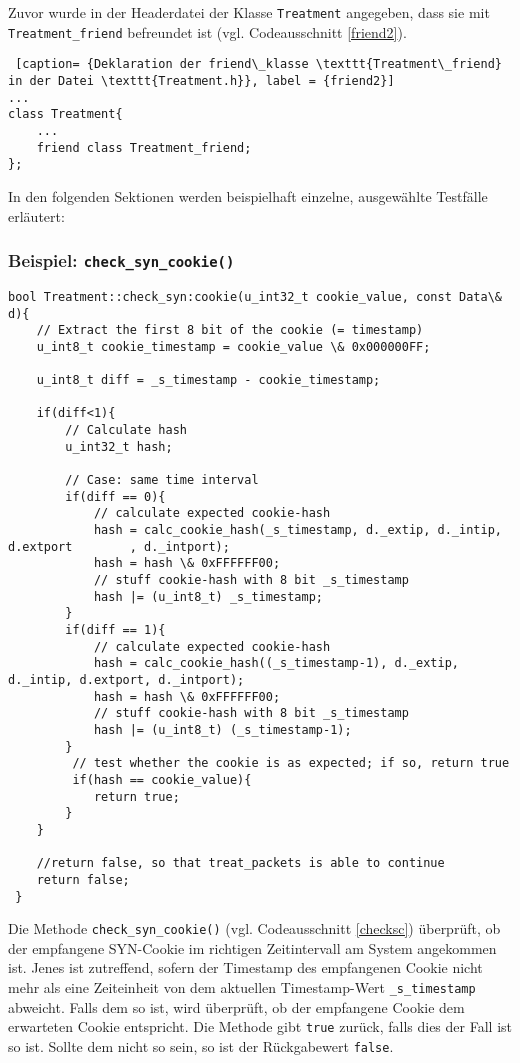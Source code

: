 \documentclass[../review_3.tex]{subfiles}
\begin{document}
Zuvor wurde in der Headerdatei der Klasse \texttt{Treatment} angegeben, dass sie mit \texttt{Treatment\_friend} befreundet ist (vgl. Codeausschnitt \ref{friend2}).

\begin{lstlisting} [caption= {Deklaration der friend\_klasse \texttt{Treatment\_friend} in der Datei \texttt{Treatment.h}}, label = {friend2}]
...
class Treatment{
    ...
    friend class Treatment_friend;
};\end{lstlisting}

In den folgenden Sektionen werden beispielhaft einzelne, ausgewählte Testfälle erläutert:
\subsubsection{Beispiel: \texttt{check\_syn\_cookie()}}
\begin{lstlisting}[caption= {Methode: \texttt{check\_syn\_cookie()} in \texttt{Treatment.cpp}}, label=checksc]
bool Treatment::check_syn:cookie(u_int32_t cookie_value, const Data\& d){
    // Extract the first 8 bit of the cookie (= timestamp)
    u_int8_t cookie_timestamp = cookie_value \& 0x000000FF;
    
    u_int8_t diff = _s_timestamp - cookie_timestamp;
    
    if(diff<1){
        // Calculate hash
        u_int32_t hash;
        
        // Case: same time interval
        if(diff == 0){
            // calculate expected cookie-hash
            hash = calc_cookie_hash(_s_timestamp, d._extip, d._intip, d.extport        , d._intport);
            hash = hash \& 0xFFFFFF00;
            // stuff cookie-hash with 8 bit _s_timestamp
            hash |= (u_int8_t) _s_timestamp;
        }
        if(diff == 1){
            // calculate expected cookie-hash
            hash = calc_cookie_hash((_s_timestamp-1), d._extip, d._intip, d.extport, d._intport);
            hash = hash \& 0xFFFFFF00;
            // stuff cookie-hash with 8 bit _s_timestamp
            hash |= (u_int8_t) (_s_timestamp-1);
        }
         // test whether the cookie is as expected; if so, return true
         if(hash == cookie_value){
            return true;
        }
    }
       
    //return false, so that treat_packets is able to continue
    return false;
 }\end{lstlisting}
Die Methode \texttt{check\_syn\_cookie()} (vgl. Codeausschnitt \ref{checksc}) überprüft, ob der empfangene SYN-Cookie im richtigen Zeitintervall am System angekommen ist. Jenes ist zutreffend, sofern der Timestamp des empfangenen Cookie nicht mehr als eine Zeiteinheit von dem aktuellen Timestamp-Wert \texttt{\_s\_timestamp} abweicht. Falls dem so ist, wird überprüft, ob der empfangene Cookie dem erwarteten Cookie entspricht. Die Methode gibt \texttt{true} zurück, falls dies der Fall ist so ist. Sollte dem nicht so sein, so ist der Rückgabewert \texttt{false}.
\end{document}

